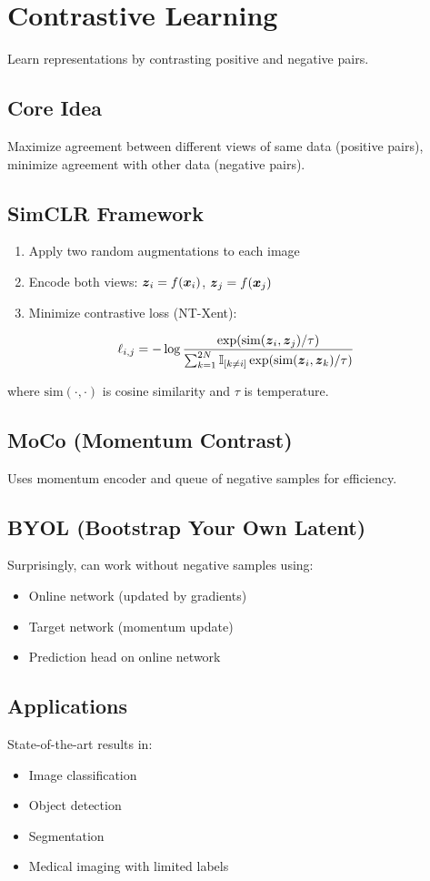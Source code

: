 
\section{Contrastive Learning}
\label{sec:contrastive-learning}

Learn representations by contrasting positive and negative pairs.

\subsection{Core Idea}

Maximize agreement between different views of same data (positive pairs), minimize agreement with other data (negative pairs).

\subsection{SimCLR Framework}

\begin{enumerate}
    \item Apply two random augmentations to each image
    \item Encode both views: $\boldsymbol{z}_i = f(\boldsymbol{x}_i)$, $\boldsymbol{z}_j = f(\boldsymbol{x}_j)$
    \item Minimize contrastive loss (NT-Xent):
\end{enumerate}

\begin{equation}
\ell_{i,j} = -\log \frac{\exp(\text{sim}(\boldsymbol{z}_i, \boldsymbol{z}_j)/\tau)}{\sum_{k=1}^{2N} \mathbb{I}_{[k \neq i]} \exp(\text{sim}(\boldsymbol{z}_i, \boldsymbol{z}_k)/\tau)}
\end{equation}

where $\text{sim}(\cdot, \cdot)$ is cosine similarity and $\tau$ is temperature.

\subsection{MoCo (Momentum Contrast)}

Uses momentum encoder and queue of negative samples for efficiency.

\subsection{BYOL (Bootstrap Your Own Latent)}

Surprisingly, can work without negative samples using:
\begin{itemize}
    \item Online network (updated by gradients)
    \item Target network (momentum update)
    \item Prediction head on online network
\end{itemize}

\subsection{Applications}

State-of-the-art results in:
\begin{itemize}
    \item Image classification
    \item Object detection
    \item Segmentation
    \item Medical imaging with limited labels
\end{itemize}

